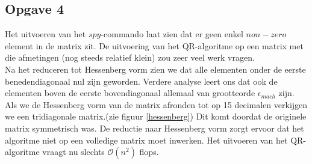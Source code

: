 \documentclass[a4paper, 12pt, titlepage]{report}
\begin{document}
\subsection{Opgave 4}
Het uitvoeren van het $spy$-commando laat zien dat er geen enkel $non-zero$ element in de matrix zit. De uitvoering van het QR-algoritme op een matrix met die afmetingen (nog steeds relatief klein) zou zeer veel werk vragen. \\
Na het reduceren tot Hessenberg vorm zien we dat alle elementen onder de eerste benedendiagonaal nul zijn geworden. Verdere analyse leert ons dat ook de elementen boven de eerste bovendiagonaal allemaal van grootteorde $\epsilon_{mach}$ zijn. Als we de Hessenberg vorm van de matrix afronden tot op 15 decimalen verkijgen we een tridiagonale matrix.(zie figuur \ref{hessenberg}) Dit komt doordat de originele matrix symmetrisch was. De reductie naar Hessenberg vorm zorgt ervoor dat het algoritme niet op een volledige matrix moet inwerken. Het uitvoeren van het QR-algoritme vraagt nu slechts $\mathcal{O}(n^2)$ flops. 
\end{document}
